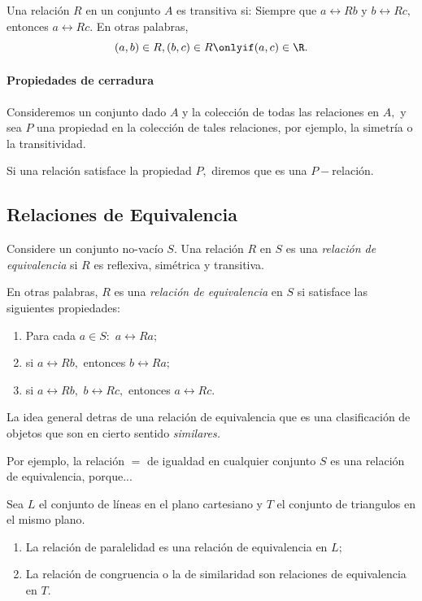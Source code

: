 	Una relación $R$ en un conjunto $A$ es transitiva si: Siempre que $a\rel{R}b$ y $b\rel{R}c,$ entonces $a\rel{R}c.$  En otras palabras,
	$$
	(a,b)\in R, (b,c)\in R \onlyif (a,c)\in \R.
	$$




 \paragraph{Propiedades de cerradura}


 Consideremos un conjunto dado $A$ y la colección de todas las relaciones en $A,$ y sea $P$ una propiedad en la colección de tales relaciones, por ejemplo, la simetría o la transitividad.


 Si una relación satisface la propiedad $P,$ diremos que es una $P-$relación.


\subsection{Relaciones de Equivalencia}

	Considere un conjunto no-vacío $S.$ Una relación $R$ en $S$ es una \emph{relación de equivalencia} si $R$ es reflexiva, sim\'etrica y transitiva.



	En otras palabras, $R$ es una \emph{relación de equivalencia} en $S$ si satisface las siguientes propiedades:
	\begin{enumerate}
		\item Para cada $a\in S:$ $a\rel{R}a;$
		\item si $a\rel{R}b,$ entonces $b\rel{R}a;$
		\item si $a\rel{R}b,$ $b\rel{R}c,$ entonces $a\rel{R}c.$
	\end{enumerate}




	La idea general detras de una relación de equivalencia que es una clasificación de objetos que son en cierto sentido \emph{similares.}


	Por ejemplo, la relación \emph{$=$} de igualdad en cualquier conjunto $S$ es una relación de equivalencia, porque...



	\begin{problema}
		\label{lip:exmp:2.12.a}
		Sea $L$ el conjunto de líneas en el plano cartesiano y $T$ el conjunto de triangulos en el mismo plano.

		\begin{enumerate}
			\item La relación de paralelidad es una relación de equivalencia en $L;$
			\item La relación de congruencia o la de similaridad son relaciones de equivalencia en $T.$
		\end{enumerate}

	\end{problema}



